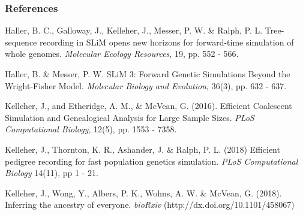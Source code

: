 \documentclass[11pt, mathserif, aspectratio=169]{beamer}
\begin{document}
\begin{frame}[allowframebreaks]
\frametitle{References}
\begin{thebibliography}{10}
\beamertemplatearticlebibitems
{\small

	Haller, B. C., Galloway, J., Kelleher, J., Messer, P. W. \& Ralph, P. L. Tree-sequence recording in SLiM opens new horizons for forward-time simulation of whole genomes. \emph{Molecular Ecology Resources}, 19, pp. 552 - 566.
	
	Haller, B. \& Messer, P. W. SLiM 3: Forward Genetic Simulations Beyond the Wright-Fisher Model. \emph{Molecular Biology and Evolution}, 36(3), pp. 632 - 637.

	Kelleher, J., and Etheridge, A. M., \& McVean, G. (2016). Efficient Coalescent Simulation and Genealogical Analysis for Large Sample Sizes. \emph{PLoS Computational Biology}, 12(5), pp. 1553 - 7358.
	
	Kelleher, J., Thornton, K. R., Ashander, J. \& Ralph, P. L. (2018) Efficient pedigree recording for fast population genetics simulation. \emph{PLoS Computational Biology} 14(11), pp 1 - 21.
	
	Kelleher, J., Wong, Y., Albers, P. K., Wohns, A. W. \& McVean, G. (2018). Inferring the ancestry of everyone. \emph{bioRxiv} (http://dx.doi.org/10.1101/458067)	
}	
\end{thebibliography}
\end{frame}
\end{document}
